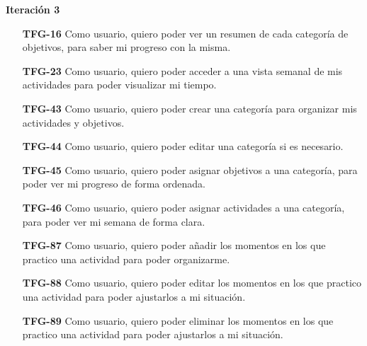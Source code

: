 \documentclass[10pt, a4paper]{aqademic}
\begin{document}
\textbf{Iteración 3}
\begin{itemize}[leftmargin=16mm]
	\item [\textbf{TFG-16}] Como usuario, quiero poder ver un resumen de cada categoría de objetivos, para saber mi progreso con la misma.
	
	\item [\textbf{TFG-23}] Como usuario, quiero poder acceder a una vista semanal de mis actividades para poder visualizar mi tiempo.
	
	\item [\textbf{TFG-43}] Como usuario, quiero poder crear una categoría para organizar mis actividades y objetivos.
	
	\item [\textbf{TFG-44}] Como usuario, quiero poder editar una categoría si es necesario.
	
	\item [\textbf{TFG-45}] Como usuario, quiero poder asignar objetivos a una categoría, para poder ver mi progreso de forma ordenada.
	
	\item [\textbf{TFG-46}] Como usuario, quiero poder asignar actividades a una categoría, para poder ver mi semana de forma clara.
	
	\item [\textbf{TFG-87}] Como usuario, quiero poder añadir los momentos en los que practico una actividad para poder organizarme.
	
	
	\item [\textbf{TFG-88}] Como usuario, quiero poder editar los momentos en los que practico una actividad para poder ajustarlos a mi situación.
	
	\item [\textbf{TFG-89}] Como usuario, quiero poder eliminar los momentos en los que practico una actividad para poder ajustarlos a mi situación.
\end{itemize}
\end{document}
